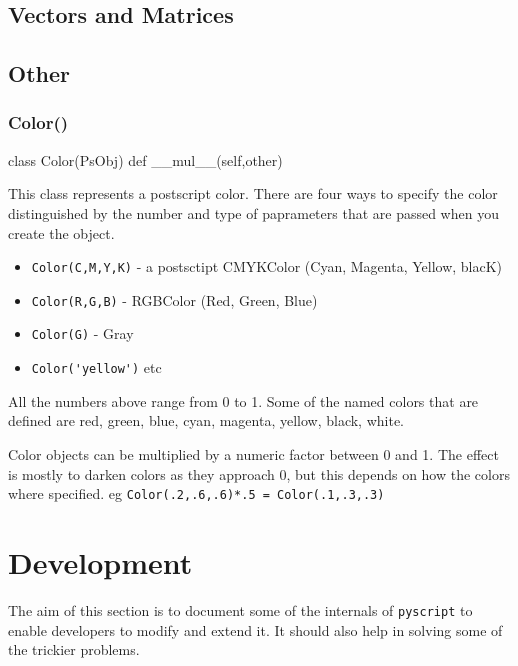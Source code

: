 \documentclass[a4paper]{book}
\begin{document}
\section{Vectors and Matrices}

\section{Other}

\subsection{Color()}
\label{sec:color}
\begin{python}
class Color(PsObj)
    def __mul__(self,other)
\end{python}

This class represents a postscript color. There are four ways to specify
the color distinguished by the number and type of paprameters that
are passed when you create the object.

\begin{itemize}
\item \Verb|Color(C,M,Y,K)| - a postsctipt CMYKColor (Cyan, Magenta, Yellow, blacK) 
\item \Verb|Color(R,G,B)| - RGBColor (Red, Green, Blue)
\item \Verb|Color(G)| - Gray
\item \Verb|Color('yellow')| etc
\end{itemize}

All the numbers above range from 0 to 1. Some of the named colors that
are defined are red, green, blue, cyan, magenta, yellow, black, white.

Color objects can be multiplied by a numeric factor between 0 and 1.
The effect is mostly to darken colors as they approach 0,
but this depends on how the colors where specified.
eg \Verb|Color(.2,.6,.6)*.5 = Color(.1,.3,.3)|



\chapter{Development}

The aim of this section is to document some of the internals of
\Verb|pyscript| to enable developers to modify and extend it. 
It should also help in solving some of the trickier problems.
\end{document}
